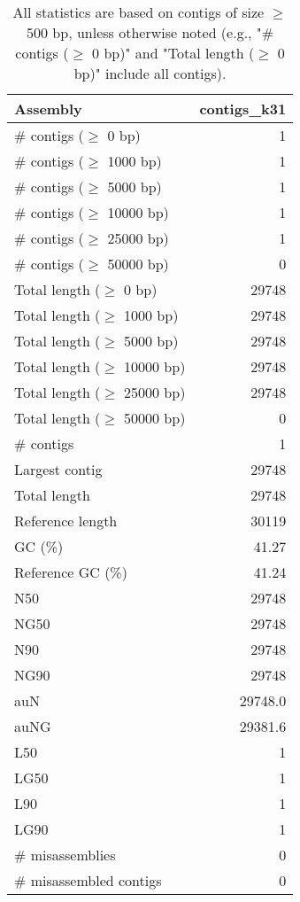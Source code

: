 \documentclass[12pt,a4paper]{article}
\begin{document}
\begin{table}[ht]
\begin{center}
\caption{All statistics are based on contigs of size $\geq$ 500 bp, unless otherwise noted (e.g., "\# contigs ($\geq$ 0 bp)" and "Total length ($\geq$ 0 bp)" include all contigs).}
\begin{tabular}{|l*{1}{|r}|}
\hline
Assembly & contigs\_k31 \\ \hline
\# contigs ($\geq$ 0 bp) & 1 \\ \hline
\# contigs ($\geq$ 1000 bp) & 1 \\ \hline
\# contigs ($\geq$ 5000 bp) & 1 \\ \hline
\# contigs ($\geq$ 10000 bp) & 1 \\ \hline
\# contigs ($\geq$ 25000 bp) & 1 \\ \hline
\# contigs ($\geq$ 50000 bp) & 0 \\ \hline
Total length ($\geq$ 0 bp) & 29748 \\ \hline
Total length ($\geq$ 1000 bp) & 29748 \\ \hline
Total length ($\geq$ 5000 bp) & 29748 \\ \hline
Total length ($\geq$ 10000 bp) & 29748 \\ \hline
Total length ($\geq$ 25000 bp) & 29748 \\ \hline
Total length ($\geq$ 50000 bp) & 0 \\ \hline
\# contigs & 1 \\ \hline
Largest contig & 29748 \\ \hline
Total length & 29748 \\ \hline
Reference length & 30119 \\ \hline
GC (\%) & 41.27 \\ \hline
Reference GC (\%) & 41.24 \\ \hline
N50 & 29748 \\ \hline
NG50 & 29748 \\ \hline
N90 & 29748 \\ \hline
NG90 & 29748 \\ \hline
auN & 29748.0 \\ \hline
auNG & 29381.6 \\ \hline
L50 & 1 \\ \hline
LG50 & 1 \\ \hline
L90 & 1 \\ \hline
LG90 & 1 \\ \hline
\# misassemblies & 0 \\ \hline
\# misassembled contigs & 0 \\ \hline

\end{tabular}
\end{center}
\end{table}
\end{document}
